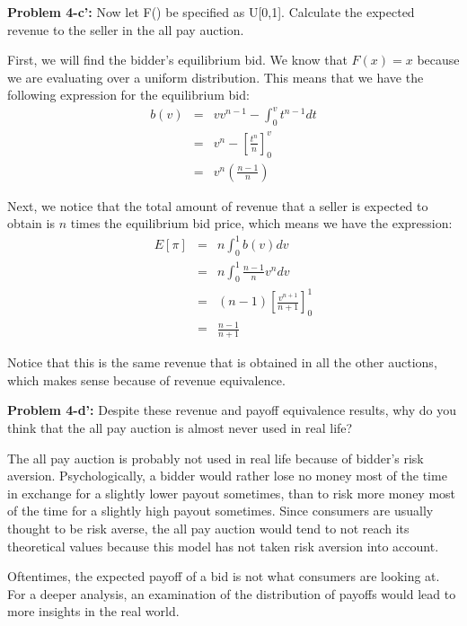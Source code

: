 \documentclass[psamsfonts]{amsart}
\newenvironment{sol}{\vspace{0.25cm}{\large \bfseries Solution:}}{\qedsymbol}
\newenvironment{prob}[1]{\begin{framed}{\large \bfseries Problem #1:}}{\end{framed}}
\begin{document}
\begin{prob}{4-c'}
Now let F() be specified as U[0,1]. Calculate the expected revenue to the seller in the all pay auction.
\end{prob}
\begin{sol}
First, we will find the bidder's equilibrium bid. We know that $F(x) = x$ because we are evaluating over a uniform distribution. This means that we have the following expression for the equilibrium bid:
\begin{eqnarray}
b(v) &=& v v^{n-1} - \int_0^v t^{n-1} dt \\
&=& v^n - \left[ \frac{t^n}{n} \right]_0^v \\
&=& v^n \left( \frac{n - 1}{n} \right)
\end{eqnarray}

Next, we notice that the total amount of revenue that a seller is expected to obtain is $n$ times the equilibrium bid price, which means we have the expression:
\begin{eqnarray}
E[\pi] &=& n \int_0^1 b(v) dv \\
&=& n \int_0^1 \frac{n-1}{n} v^n dv \\
&=& (n-1) \left[ \frac{v^{n+1}}{n+1} \right]_0^1 \\
&=& \frac{n-1}{n+1}
\end{eqnarray}

Notice that this is the same revenue that is obtained in all the other auctions, which makes sense because of revenue equivalence.
\end{sol}

\begin{prob}{4-d'}
Despite these revenue and payoff equivalence results, why do you think that the all pay auction is almost never used in real life?
\end{prob}
\begin{sol}
The all pay auction is probably not used in real life because of bidder's risk aversion. Psychologically, a bidder would rather lose no money most of the time in exchange for a slightly lower payout sometimes, than to risk more money most of the time for a slightly high payout sometimes. Since consumers are usually thought to be risk averse, the all pay auction would tend to not reach its theoretical values because this model has not taken risk aversion into account.

Oftentimes, the expected payoff of a bid is not what consumers are looking at. For a deeper analysis, an examination of the distribution of payoffs would lead to more insights in the real world.
\end{sol}
\end{document}
